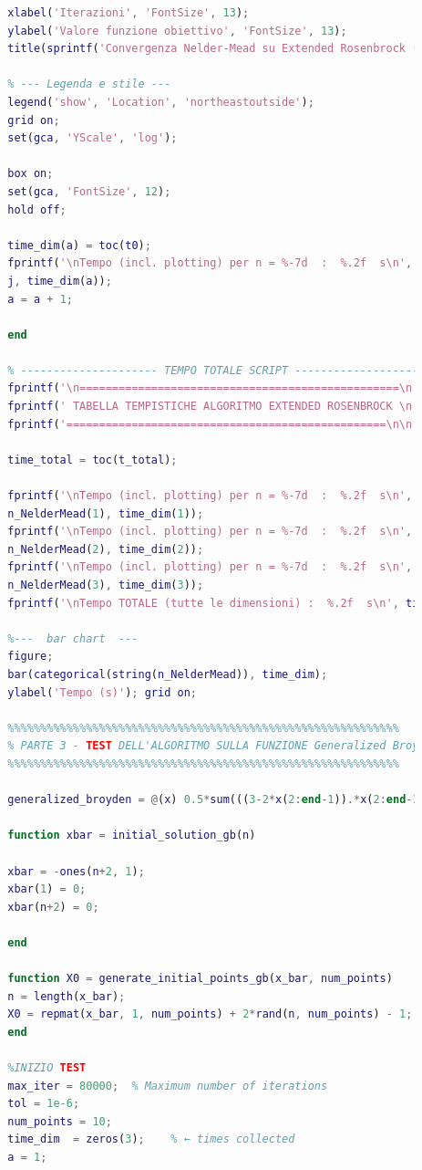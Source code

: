 \documentclass[a4paper,12pt]{article}
\begin{document}
\begin{lstlisting}[language=Matlab,caption={Full script: Nelder Mead Method on all function},label={lst:rosenbrock-extended}]
		% --- Labels and titles ---
		xlabel('Iterazioni', 'FontSize', 13);
		ylabel('Valore funzione obiettivo', 'FontSize', 13);
		title(sprintf('Convergenza Nelder-Mead su Extended Rosenbrock (n = %d)', j), 'FontSize', 14);
		
		% --- Legenda e stile ---
		legend('show', 'Location', 'northeastoutside');
		grid on;
		set(gca, 'YScale', 'log'); 
		
		box on;
		set(gca, 'FontSize', 12);   
		hold off;
		
		time_dim(a) = toc(t0);
		fprintf('\nTempo (incl. plotting) per n = %-7d  :  %.2f  s\n', ...
		j, time_dim(a));
		a = a + 1;
		
		end
		
		% --------------------- TEMPO TOTALE SCRIPT ----------------------
		fprintf('\n=================================================\n');
		fprintf(' TABELLA TEMPISTICHE ALGORITMO EXTENDED ROSENBROCK \n');
		fprintf('=================================================\n\n');
		
		time_total = toc(t_total);
		
		fprintf('\nTempo (incl. plotting) per n = %-7d  :  %.2f  s\n', ...
		n_NelderMead(1), time_dim(1));
		fprintf('\nTempo (incl. plotting) per n = %-7d  :  %.2f  s\n', ...
		n_NelderMead(2), time_dim(2));
		fprintf('\nTempo (incl. plotting) per n = %-7d  :  %.2f  s\n', ...
		n_NelderMead(3), time_dim(3));
		fprintf('\nTempo TOTALE (tutte le dimensioni) :  %.2f  s\n', time_total);
		
		%---  bar chart  ---
		figure;
		bar(categorical(string(n_NelderMead)), time_dim);
		ylabel('Tempo (s)'); grid on;
		
		%%%%%%%%%%%%%%%%%%%%%%%%%%%%%%%%%%%%%%%%%%%%%%%%%%%%%%%%%%%%
		% PARTE 3 - TEST DELL'ALGORITMO SULLA FUNZIONE Generalized Broyden tridiagonal 
		%%%%%%%%%%%%%%%%%%%%%%%%%%%%%%%%%%%%%%%%%%%%%%%%%%%%%%%%%%%%
		
		generalized_broyden = @(x) 0.5*sum(((3-2*x(2:end-1)).*x(2:end-1)+1-x(1:end-2)-x(3:end)).^2);
		
		function xbar = initial_solution_gb(n)
		
		xbar = -ones(n+2, 1);          
		xbar(1) = 0;       
		xbar(n+2) = 0;
		
		end
		
		function X0 = generate_initial_points_gb(x_bar, num_points)
		n = length(x_bar);
		X0 = repmat(x_bar, 1, num_points) + 2*rand(n, num_points) - 1;
		end
		
		%INIZIO TEST
		max_iter = 80000;  % Maximum number of iterations
		tol = 1e-6;
		num_points = 10;
		time_dim  = zeros(3);    % ← times collected
		a = 1;
		

\end{lstlisting}
\end{document}
